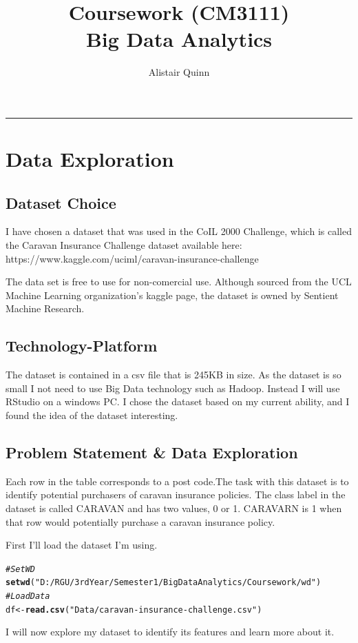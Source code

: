 \documentclass{article}\usepackage[]{graphicx}\usepackage[]{color}
\makeatletter
\newcommand{\hlstr}[1]{\textcolor[rgb]{0.192,0.494,0.8}{#1}}%
\newcommand{\hlcom}[1]{\textcolor[rgb]{0.678,0.584,0.686}{\textit{#1}}}%
\newcommand{\hlstd}[1]{\textcolor[rgb]{0.345,0.345,0.345}{#1}}%
\newcommand{\hlkwb}[1]{\textcolor[rgb]{0.69,0.353,0.396}{#1}}%
\newcommand{\hlkwd}[1]{\textcolor[rgb]{0.737,0.353,0.396}{\textbf{#1}}}%
\newenvironment{kframe}{%
 \def\at@end@of@kframe{}%
 \ifinner\ifhmode%
  \def\at@end@of@kframe{\end{minipage}}%
  \begin{minipage}{\columnwidth}%
 \fi\fi%
 \def\FrameCommand##1{\hskip\@totalleftmargin \hskip-\fboxsep
 \colorbox{shadecolor}{##1}\hskip-\fboxsep
     \hskip-\linewidth \hskip-\@totalleftmargin \hskip\columnwidth}%
 \MakeFramed {\advance\hsize-\width
   \@totalleftmargin\z@ \linewidth\hsize
   \@setminipage}}%
 {\par\unskip\endMakeFramed%
 \at@end@of@kframe}
\newenvironment{knitrout}{}{} %
\makeatother
\begin{document}
\title{Coursework (CM3111)\\Big Data Analytics}
\author{Alistair Quinn}
\maketitle 

\par\noindent\rule{\textwidth}{0.4pt}

\section{Data Exploration}
\subsection{Dataset Choice}
I have chosen a dataset that was used in the CoIL 2000 Challenge, which is called the Caravan Insurance Challenge dataset available here: https://www.kaggle.com/uciml/caravan-insurance-challenge 

The data set is free to use for non-comercial use. Although sourced from the UCL Machine Learning organization's kaggle page, the dataset is owned by Sentient Machine Research. 
\subsection{Technology-Platform}
The dataset is contained in a csv file that is 245KB in size. As the dataset is so small I not need to use Big Data technology such as Hadoop. Instead I will use RStudio on a windows PC. I chose the dataset based on my current ability, and I found the idea of the dataset interesting. 
\subsection{Problem Statement & Data Exploration}
Each row in the table corresponds to a post code.The task with this dataset is to identify potential purchasers of caravan insurance policies. The class label in the dataset is called CARAVAN and has two values, 0 or 1. CARAVARN is 1 when that row would potentially purchase a caravan insurance policy. 

First I'll load the dataset I'm using.
\begin{knitrout}
\color{fgcolor}\begin{kframe}
\begin{alltt}
\hlcom{#Set WD}
\hlkwd{setwd}\hlstd{(}\hlstr{"D:/RGU/3rdYear/Semester1/Big Data Analytics/Coursework/wd"}\hlstd{)}
\hlcom{#Load Data}
\hlstd{df} \hlkwb{<-} \hlkwd{read.csv}\hlstd{(}\hlstr{"Data/caravan-insurance-challenge.csv"}\hlstd{)}
\end{alltt}
\end{kframe}
\end{knitrout}
I will now explore my dataset to identify its features and learn more about it. 
\end{document}

